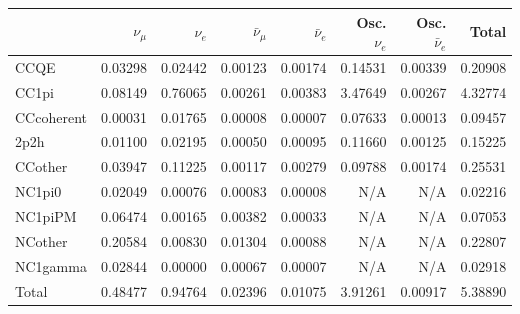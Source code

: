 \begin{tabular} { | l ||r | r | r | r | r | r | | r | }
\hline
              & $\nu_\mu$            & $\nu_e$              & $\bar{\nu}_{\mu}$    & $\bar{\nu}_{e}$      & Osc. $\nu_e$         & Osc. $\bar{\nu}_{e}$ & Total                \\ \hline\hline
 CCQE         & 0.03298              & 0.02442              & 0.00123              & 0.00174              & 0.14531              & 0.00339              & 0.20908              \\ \hline
 CC1pi        & 0.08149              & 0.76065              & 0.00261              & 0.00383              & 3.47649              & 0.00267              & 4.32774              \\ \hline
 CCcoherent   & 0.00031              & 0.01765              & 0.00008              & 0.00007              & 0.07633              & 0.00013              & 0.09457              \\ \hline
 2p2h         & 0.01100              & 0.02195              & 0.00050              & 0.00095              & 0.11660              & 0.00125              & 0.15225              \\ \hline
 CCother      & 0.03947              & 0.11225              & 0.00117              & 0.00279              & 0.09788              & 0.00174              & 0.25531              \\ \hline
 NC1pi0       & 0.02049              & 0.00076              & 0.00083              & 0.00008              & N/A                  & N/A                  & 0.02216              \\ \hline
 NC1piPM      & 0.06474              & 0.00165              & 0.00382              & 0.00033              & N/A                  & N/A                  & 0.07053              \\ \hline
 NCother      & 0.20584              & 0.00830              & 0.01304              & 0.00088              & N/A                  & N/A                  & 0.22807              \\ \hline
 NC1gamma     & 0.02844              & 0.00000              & 0.00067              & 0.00007              & N/A                  & N/A                  & 0.02918              \\ \hline
\hline
 Total        & 0.48477              & 0.94764              & 0.02396              & 0.01075              & 3.91261              & 0.00917              & 5.38890              \\ \hline

\end{tabular}
